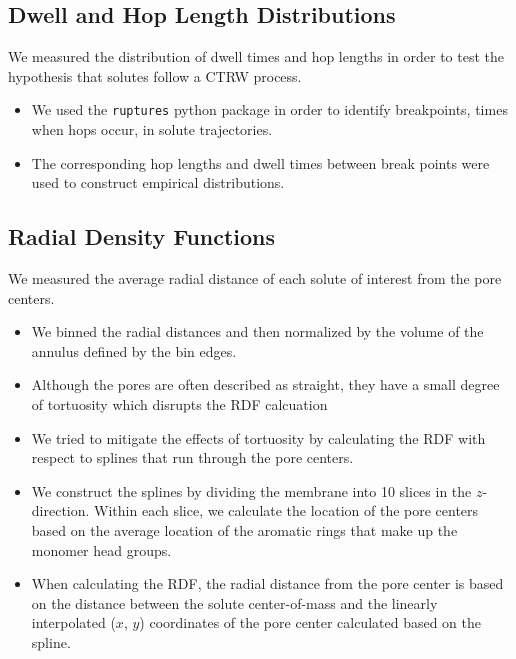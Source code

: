 \documentclass{article}
\begin{document}
  \subsection*{Dwell and Hop Length Distributions}\label{method:hops_and_dwells}


  \noindent We measured the distribution of dwell times and hop lengths in order to test
  the hypothesis that solutes follow a CTRW process.
  \begin{itemize}
	\item We used the \texttt{ruptures} python package in order to identify
	breakpoints, times when hops occur, in solute trajectories.\cite{truong_ruptures:_2018}
	\item The corresponding hop lengths and dwell times between break points were 
	used to construct empirical distributions.
  \end{itemize}

  \subsection*{Radial Density Functions}\label{method:rdfs}

  We measured the average radial distance of each solute of interest from the pore
  centers.
  \begin{itemize}
	\item We binned the radial distances and then normalized by the volume
	of the annulus defined by the bin edges.
	\item Although the pores are often described as straight, they have a
	small degree of tortuosity which disrupts the RDF calcuation 
	\item We tried to mitigate the effects of tortuosity by calculating the RDF
	with respect to splines that run through the pore centers.
	\item We construct the splines by dividing the membrane into 10 slices
	in the $z$-direction. Within each slice, we calculate the location of 
	the pore centers based on the average location of the aromatic rings
	that make up the monomer head groups.
	\item When calculating the RDF, the radial distance from the pore center
	is based on the distance between the solute center-of-mass and the linearly
	interpolated ($x$, $y$)	coordinates of the pore center calculated based
	on the spline.
  \end{itemize}
  
\end{document}
